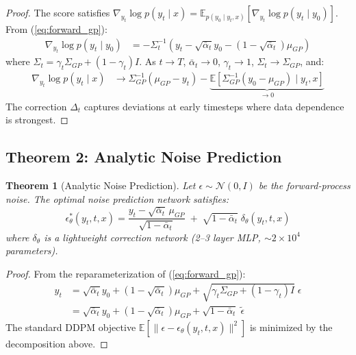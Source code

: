 \documentclass[conference]{IEEEtran}
\newtheorem{theorem}{Theorem}
\begin{document}
\begin{proof}
The score satisfies $\nabla_{y_t} \log p(y_t \mid x) = \mathbb{E}_{p(y_0 \mid y_t, x)}[\nabla_{y_t} \log p(y_t \mid y_0)]$. From (\ref{eq:forward_gp}):
\begin{align}
\nabla_{y_t} \log p(y_t \mid y_0) &= -\Sigma_t^{-1}(y_t - \sqrt{\bar{\alpha}_t} y_0 - (1 - \sqrt{\bar{\alpha}_t})\mu_{GP})
\end{align}
where $\Sigma_t = \gamma_t \Sigma_{GP} + (1 - \gamma_t)I$. As $t \to T$, $\bar{\alpha}_t \to 0$, $\gamma_t \to 1$, $\Sigma_t \to \Sigma_{GP}$, and:
\begin{align}
\nabla_{y_t} \log p(y_t \mid x) &\to \Sigma_{GP}^{-1}(\mu_{GP} - y_t) - \underbrace{\mathbb{E}[\Sigma_{GP}^{-1}(y_0 - \mu_{GP}) \mid y_t, x]}_{\to 0}
\end{align}
The correction $\Delta_t$ captures deviations at early timesteps where data dependence is strongest.
\end{proof}

\subsection{Theorem 2: Analytic Noise Prediction}

\begin{theorem}[Analytic Noise Prediction]
\label{thm:noise}
Let $\epsilon \sim \mathcal{N}(0, I)$ be the forward-process noise. The optimal noise prediction network satisfies:
\begin{equation}
\boxed{\epsilon_\theta^*(y_t, t, x) = \frac{y_t - \sqrt{\bar{\alpha}_t}\, \mu_{GP}}{\sqrt{1 - \bar{\alpha}_t}} \;+\; \sqrt{1 - \bar{\alpha}_t}\; \delta_\theta(y_t, t, x)} \label{eq:noise_pred}
\end{equation}
where $\delta_\theta$ is a lightweight correction network (2--3 layer MLP, $\sim 2 \times 10^4$ parameters).
\end{theorem}

\begin{proof}
From the reparameterization of (\ref{eq:forward_gp}):
\begin{align}
y_t &= \sqrt{\bar{\alpha}_t} y_0 + (1 - \sqrt{\bar{\alpha}_t})\mu_{GP} + \sqrt{\gamma_t \Sigma_{GP} + (1 - \gamma_t)I}\; \epsilon \\
&= \sqrt{\bar{\alpha}_t} y_0 + (1 - \sqrt{\bar{\alpha}_t})\mu_{GP} + \sqrt{1 - \bar{\alpha}_t}\; \tilde{\epsilon}
\end{align}
The standard DDPM objective $\mathbb{E}[\|\epsilon - \epsilon_\theta(y_t, t, x)\|^2]$ is minimized by the decomposition above.
\end{proof}
\end{document}
